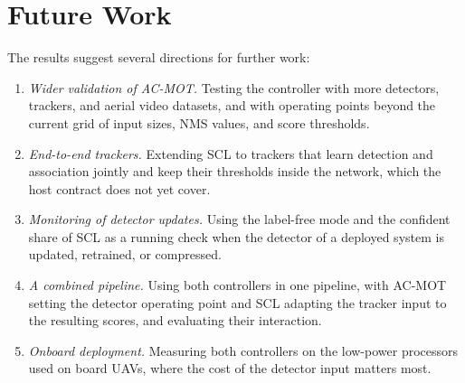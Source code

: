 \section{Future Work}\label{sec:conc-future}
The results suggest several directions for further work:
\begin{enumerate}
\item \emph{Wider validation of AC-MOT.} Testing the controller with more detectors, trackers, and aerial video datasets, and with operating points beyond the current grid of input sizes, NMS values, and score thresholds.
\item \emph{End-to-end trackers.} Extending SCL to trackers that learn detection and association jointly and keep their thresholds inside the network, which the host contract does not yet cover.
\item \emph{Monitoring of detector updates.} Using the label-free mode and the confident share of SCL as a running check when the detector of a deployed system is updated, retrained, or compressed.
\item \emph{A combined pipeline.} Using both controllers in one pipeline, with AC-MOT setting the detector operating point and SCL adapting the tracker input to the resulting scores, and evaluating their interaction.
\item \emph{Onboard deployment.} Measuring both controllers on the low-power processors used on board UAVs, where the cost of the detector input matters most.
\end{enumerate}
